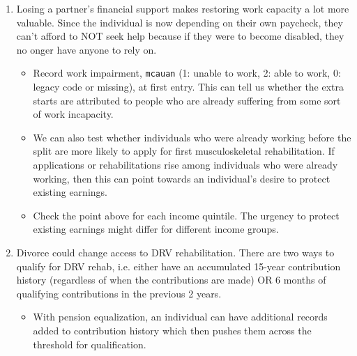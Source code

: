 \documentclass[a4paper,12pt]{article}
\theoremstyle{plain}
\theoremstyle{definition}
\theoremstyle{TheoremNum}
\theoremstyle{CorollaryNum}
\theoremstyle{PropositionNum}
\theoremstyle{TheoremNum}
\begin{document}
{\begin{enumerate}
\begin{itemize}
    \end{itemize}
    \item Losing a partner's financial support makes restoring work capacity a lot more valuable. Since the individual is now depending on their own paycheck, they can't afford to NOT seek help because if they were to become disabled, they no onger have anyone to rely on.
    \begin{itemize}
        \item Record work impairment, \texttt{mcauan} (1: unable to work, 2: able to work, 0: legacy code or missing), at first entry. This can tell us whether the extra starts are attributed to people who are already suffering from some sort of work incapacity. 
        \item We can also test whether individuals who were already working before the split are more likely to apply for first musculoskeletal rehabilitation. If applications or rehabilitations rise among individuals who were already working, then this can point towards an individual's desire to protect existing earnings.
        \item Check the point above for each income quintile. The urgency to protect existing earnings might differ for different income groups.
    \end{itemize}
    \item Divorce could change access to DRV rehabilitation. There are two ways to qualify for DRV rehab, i.e. either have an accumulated 15-year contribution history (regardless of when the contributions are made) OR 6 months of qualifying contributions in the previous 2 years. 
    \begin{itemize}
        \item With pension equalization, an individual can have additional records added to contribution history which then pushes them across the threshold for qualification. 
    \end{itemize}
\end{enumerate}
}



\end{document}

